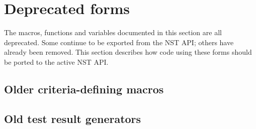 
\section{Deprecated forms}
The macros, functions and variables documented in this section are all
deprecated.  Some continue to be exported from the NST API; others
have already been removed.  This section describes how code using
these forms should be ported to the active NST API.

\subsection{Older criteria-defining macros}
\label{sec:def-values-criterion}
\label{sec:def-form-criterion}






\subsection{Old test result generators}





